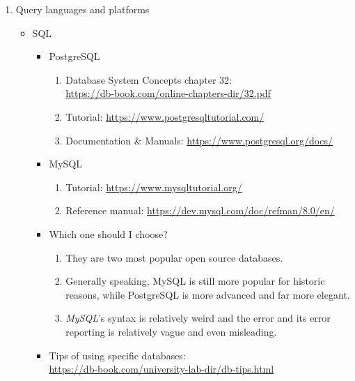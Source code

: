 \documentclass{article}
\begin{document}
\begin{enumerate}
    \item Query languages and platforms
    \begin{itemize}
        \item SQL
        \begin{itemize}
            \item PostgreSQL
            \begin{enumerate}
                \item Database System Concepts chapter 32:\\
                \href{https://db-book.com/online-chapters-dir/32.pdf}{https://db-book.com/online-chapters-dir/32.pdf}
                \item Tutorial:
                \href{https://www.postgresqltutorial.com/}{https://www.postgresqltutorial.com/}
                \item Documentation \& Manuals:
                \href{https://www.postgresql.org/docs/}{https://www.postgresql.org/docs/}
            \end{enumerate}     
            \item MySQL
            \begin{enumerate}
                \item Tutorial:
                \href{https://www.mysqltutorial.org/}{https://www.mysqltutorial.org/}
                \item Reference manual:
                \href{https://dev.mysql.com/doc/refman/8.0/en/}{https://dev.mysql.com/doc/refman/8.0/en/}
            \end{enumerate}
            \item Which one should I choose?
            \begin{enumerate}
                \item They are two most popular open source databases.
                \item Generally speaking, MySQL is still more popular for historic reasons, while PostgreSQL is more advanced and far more elegant.
                \item \emph{MySQL}'s syntax is relatively weird and the error and its error reporting is relatively vague and even misleading.
            \end{enumerate}
            \item Tips of using specific databases:\\
            \href{https://db-book.com/university-lab-dir/db-tips.html}{https://db-book.com/university-lab-dir/db-tips.html}
        \end{itemize}

\end{itemize}
\end{enumerate}
\end{document}
